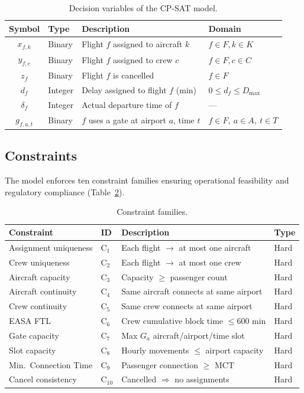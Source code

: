 \documentclass[12pt,number]{elsarticle}
\begin{document}
\begin{table}[H]
\centering
\small
\caption{Decision variables of the CP-SAT model.}
\label{tab:vars}
\begin{tabular}{@{}clll@{}}
\toprule
\textbf{Symbol} & \textbf{Type} & \textbf{Description} & \textbf{Domain} \\
\midrule
$x_{f,k}$ & Binary & Flight $f$ assigned to aircraft $k$ & $f \in F, k \in K$ \\
$y_{f,c}$ & Binary & Flight $f$ assigned to crew $c$ & $f \in F, c \in C$ \\
$z_f$ & Binary & Flight $f$ is cancelled & $f \in F$ \\
$d_f$ & Integer & Delay assigned to flight $f$ (min) & $0 \leq d_f \leq D_{\max}$ \\
$\delta_f$ & Integer & Actual departure time of $f$ & --- \\
$g_{f,a,t}$ & Binary & $f$ uses a gate at airport $a$, time $t$ & $f \in F,\ a \in A,\ t \in T$ \\
\bottomrule
\end{tabular}
\end{table}

\subsection{Constraints}

The model enforces ten constraint families ensuring operational feasibility and regulatory compliance (Table~\ref{tab:constraints}).

\begin{table}[H]
\centering
\caption{Constraint families.}
\label{tab:constraints}
\small
\begin{tabular}{@{}llll@{}}
\toprule
\textbf{Constraint} & \textbf{ID} & \textbf{Description} & \textbf{Type} \\
\midrule
Assignment uniqueness & C$_1$ & Each flight $\to$ at most one aircraft & Hard \\
Crew uniqueness & C$_2$ & Each flight $\to$ at most one crew & Hard \\
Aircraft capacity & C$_3$ & Capacity $\geq$ passenger count & Hard \\
Aircraft continuity & C$_4$ & Same aircraft connects at same airport & Hard \\
Crew continuity & C$_5$ & Same crew connects at same airport & Hard \\
EASA FTL & C$_6$ & Crew cumulative block time $\leq 600$ min & Hard \\
Gate capacity & C$_7$ & Max $G_a$ aircraft/airport/time slot & Hard \\
Slot capacity & C$_8$ & Hourly movements $\leq$ airport capacity & Hard \\
Min.\ Connection Time & C$_9$ & Passenger connection $\geq$ MCT & Hard \\
Cancel consistency & C$_{10}$ & Cancelled $\Rightarrow$ no assignments & Hard \\
\bottomrule
\end{tabular}
\end{table}
\end{document}

